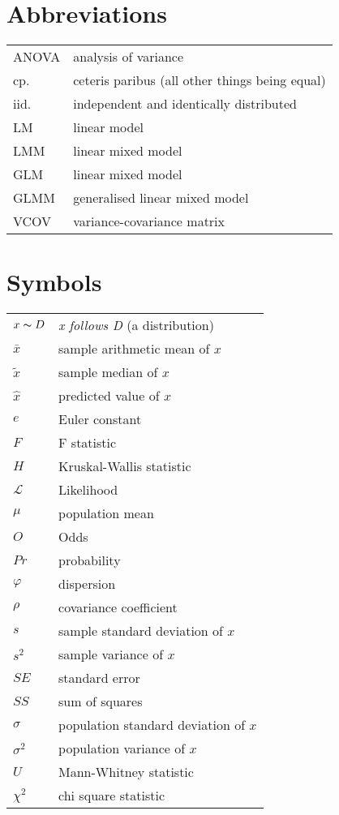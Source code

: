 
\section*{Abbreviations}

\begin{tabular}{ll}
  ANOVA & analysis of variance \\
  cp.   & ceteris paribus (all other things being equal) \\
  iid.  & independent and identically distributed \\
  LM    & linear model \\
  LMM   & linear mixed model \\
  GLM   & linear mixed model \\
  GLMM  & generalised linear mixed model \\
  VCOV  & variance-covariance matrix \\
\end{tabular}


\section*{Symbols}

\begin{tabular}{ll} 

  $x\thicksim D$    & \textit{x follows D} (a distribution) \\
  $\bar{x}$         & sample arithmetic mean of $x$\\
  $\tilde{x}$       & sample median of $x$\\
  $\hat{x}$         & predicted value of $x$\\
  
  $e$               & Euler constant \\
  $F$               & F statistic \\
  $H$               & Kruskal-Wallis statistic \\
  $\mathcal{L}$     & Likelihood \\
  $\mu$             & population mean \\
  $O$               & Odds \\
  $Pr$              & probability \\
  $\varphi$         & dispersion \\
  $\rho$            & covariance coefficient \\
  $s$               & sample standard deviation of $x$ \\
  $s^2$             & sample variance of $x$ \\ 
  $SE$              & standard error \\
  $SS$              & sum of squares \\
  $\sigma$          & population standard deviation of $x$ \\
  $\sigma^2$        & population variance of $x$ \\ 
  $U$               & Mann-Whitney statistic \\
  $\chi^2$          & chi square statistic \\
\end{tabular} 

